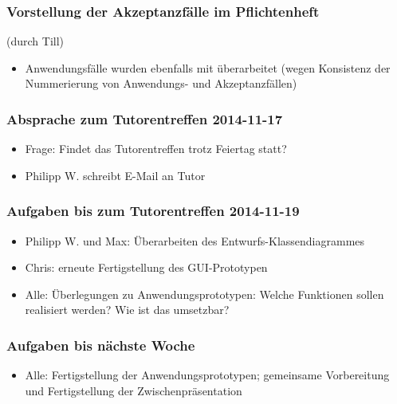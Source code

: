 \documentclass[12pt,a4paper]{article}
\begin{document}
\subsubsection*{Vorstellung der Akzeptanzfälle im Pflichtenheft}
(durch Till)
\begin{itemize}
\item Anwendungsfälle wurden ebenfalls mit überarbeitet (wegen Konsistenz der Nummerierung von Anwendungs- und Akzeptanzfällen)
\end{itemize}

\subsubsection*{Absprache zum Tutorentreffen 2014-11-17}
\begin{itemize}
\item Frage: Findet das Tutorentreffen trotz Feiertag statt?
\item Philipp W. schreibt E-Mail an Tutor
\end{itemize}

\subsubsection*{Aufgaben bis zum Tutorentreffen 2014-11-19}
\begin{itemize}
\item Philipp W. und Max: Überarbeiten des Entwurfs-Klassendiagrammes
\item Chris: erneute Fertigstellung des GUI-Prototypen
\item Alle: Überlegungen zu Anwendungsprototypen: Welche Funktionen sollen realisiert werden? Wie ist das umsetzbar?
\end{itemize}

\subsubsection*{Aufgaben bis nächste Woche}
\begin{itemize}
\item Alle: Fertigstellung der Anwendungsprototypen; gemeinsame Vorbereitung und Fertigstellung der Zwischenpräsentation
\end{itemize}
\end{document}
